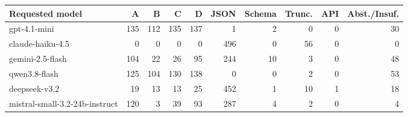 \begin{tabular}{lrrrrrrrrr}
\toprule
Requested model & A & B & C & D & JSON & Schema & Trunc. & API & Abst./Insuf. \\
\midrule
gpt-4.1-mini & 135 & 112 & 135 & 137 & 1 & 2 & 0 & 0 & 30 \\
claude-haiku-4.5 & 0 & 0 & 0 & 0 & 496 & 0 & 56 & 0 & 0 \\
gemini-2.5-flash & 104 & 22 & 26 & 95 & 244 & 10 & 3 & 0 & 48 \\
qwen3.8-flash & 125 & 104 & 130 & 138 & 0 & 0 & 2 & 0 & 53 \\
deepseek-v3.2 & 19 & 13 & 13 & 25 & 452 & 1 & 10 & 1 & 18 \\
mistral-small-3.2-24b-instruct & 120 & 3 & 39 & 93 & 287 & 4 & 2 & 0 & 4 \\
\bottomrule
\end{tabular}
